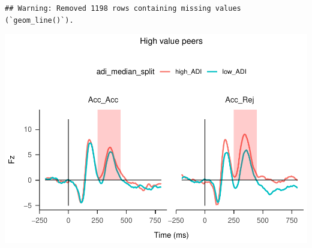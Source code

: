 \documentclass[
]{article}
\begin{document}
\begin{verbatim}
## Warning: Removed 1198 rows containing missing values (`geom_line()`).
\end{verbatim}

\includegraphics{do01_BUDS_files/figure-latex/unnamed-chunk-26-2.pdf}
\end{document}
